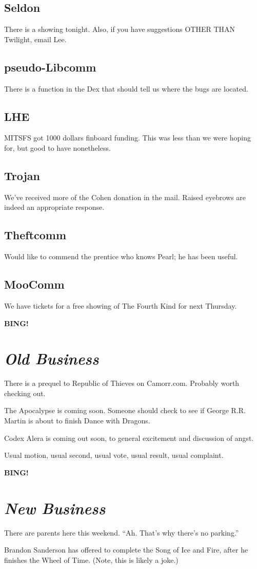 \documentclass[10pt]{article}
\newcommand{\bing}{{\bf BING!} }
\newcommand{\goto}[1]{\bing \vskip 12pt \section*{{\em{#1}}}}
\begin{document}
\subsection*{Seldon}
There is a showing tonight. Also, if you have suggestions OTHER THAN Twilight, email Lee.

\subsection*{pseudo-Libcomm}
There is a function in the Dex that should tell us where the bugs are located.

\subsection*{LHE}
MITSFS got 1000 dollars finboard funding. This was less than we were hoping for, but good to have nonetheless.

\subsection*{Trojan}
We've received more of the Cohen donation in the mail. Raised eyebrows are indeed an appropriate response.

\subsection*{Theftcomm}
Would like to commend the prentice who knows Pearl; he has been useful.

\subsection*{MooComm}
We have tickets for a free showing of The Fourth Kind for next Thursday.

\goto{Old Business}
There is a prequel to Republic of Thieves on Camorr.com. Probably worth checking out.

The Apocalypse is coming soon. Someone should check to see if George R.R. Martin is about to finish Dance with Dragons. 

Codex Alera is coming out soon, to general excitement and discussion of angst.

Usual motion, usual second, usual vote, usual result, usual complaint.

\goto{New Business}

There are parents here this weekend. ``Ah. That's why there's no parking.''

Brandon Sanderson has offered to complete the Song of Ice and Fire, after he finishes the Wheel of Time. (Note, this is likely a joke.)
\end{document}
